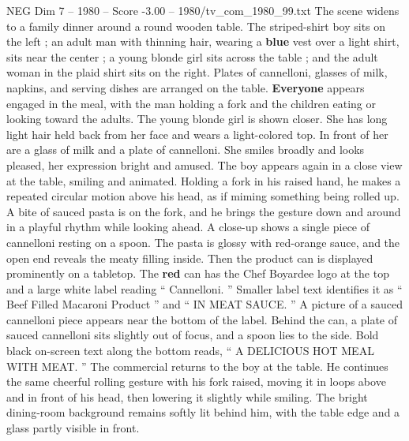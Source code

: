 \begin{textsample}{NEG Dim 7 – 1980 – Score -3.00 – 1980/tv\_com\_1980\_99.txt}
The scene widens to a family dinner around a round wooden table.
The striped-shirt boy sits on the left ; an adult man with thinning hair, wearing a \textbf{blue} vest over a light shirt, sits near the center ; a young blonde girl sits across the table ; and the adult woman in the plaid shirt sits on the right.
Plates of cannelloni, glasses of milk, napkins, and serving dishes are arranged on the table. \textbf{Everyone} appears engaged in the meal, with the man holding a fork and the children eating or looking toward the adults.
The young blonde girl is shown closer.
She has long light hair held back from her face and wears a light-colored top.
In front of her are a glass of milk and a plate of cannelloni.
She smiles broadly and looks pleased, her expression bright and amused.
The boy appears again in a close view at the table, smiling and animated.
Holding a fork in his raised hand, he makes a repeated circular motion above his head, as if miming something being rolled up.
A bite of sauced pasta is on the fork, and he brings the gesture down and around in a playful rhythm while looking ahead.
A close-up shows a single piece of cannelloni resting on a spoon.
The pasta is glossy with red-orange sauce, and the open end reveals the meaty filling inside.
Then the product can is displayed prominently on a tabletop.
The \textbf{red} can has the Chef Boyardee logo at the top and a large white label reading “ Cannelloni. ” Smaller label text identifies it as “ Beef Filled Macaroni Product ” and “ IN MEAT SAUCE. ” A picture of a sauced cannelloni piece appears near the bottom of the label.
Behind the can, a plate of sauced cannelloni sits slightly out of focus, and a spoon lies to the side.
Bold black on-screen text along the bottom reads, “ A DELICIOUS HOT MEAL WITH MEAT. ” The commercial returns to the boy at the table.
He continues the same cheerful rolling gesture with his fork raised, moving it in loops above and in front of his head, then lowering it slightly while smiling.
The bright dining-room background remains softly lit behind him, with the table edge and a glass partly visible in front.

\end{textsample}

